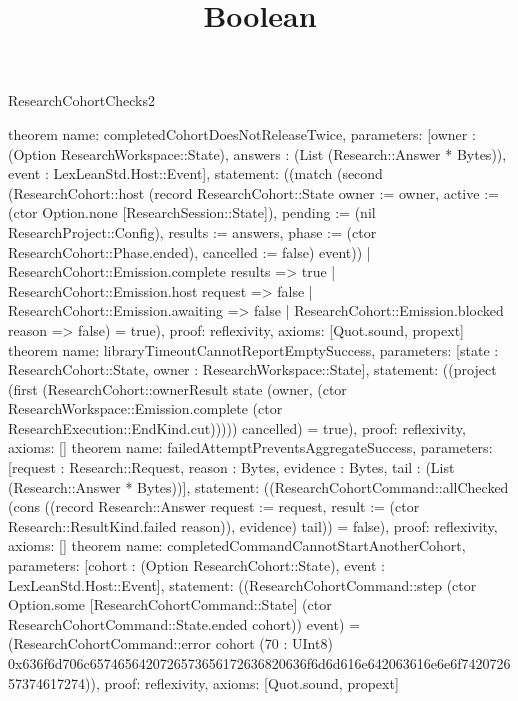 \begin{lexlean}{ResearchCohortChecks2}
\title{Boolean}
\begin{semanticmodule}
theorem{
 name: completedCohortDoesNotReleaseTwice,
 parameters: [owner : (Option ResearchWorkspace::State), answers : (List (Research::Answer * Bytes)), event : LexLeanStd.Host::Event],
 statement: ((match (second (ResearchCohort::host (record ResearchCohort::State {owner := owner, active := (ctor Option.none [ResearchSession::State]), pending := (nil ResearchProject::Config), results := answers, phase := (ctor ResearchCohort::Phase.ended), cancelled := false}) event)) | ResearchCohort::Emission.complete results => true | ResearchCohort::Emission.host request => false | ResearchCohort::Emission.awaiting => false | ResearchCohort::Emission.blocked reason => false) = true),
 proof: reflexivity{},
 axioms: [Quot.sound, propext]
}
theorem{
 name: libraryTimeoutCannotReportEmptySuccess,
 parameters: [state : ResearchCohort::State, owner : ResearchWorkspace::State],
 statement: ((project (first (ResearchCohort::ownerResult state (owner, (ctor ResearchWorkspace::Emission.complete (ctor ResearchExecution::EndKind.cut))))) cancelled) = true),
 proof: reflexivity{},
 axioms: []
}
theorem{
 name: failedAttemptPreventsAggregateSuccess,
 parameters: [request : Research::Request, reason : Bytes, evidence : Bytes, tail : (List (Research::Answer * Bytes))],
 statement: ((ResearchCohortCommand::allChecked (cons ((record Research::Answer {request := request, result := (ctor Research::ResultKind.failed reason)}), evidence) tail)) = false),
 proof: reflexivity{},
 axioms: []
}
theorem{
 name: completedCommandCannotStartAnotherCohort,
 parameters: [cohort : (Option ResearchCohort::State), event : LexLeanStd.Host::Event],
 statement: ((ResearchCohortCommand::step (ctor Option.some [ResearchCohortCommand::State] (ctor ResearchCohortCommand::State.ended cohort)) event) = (ResearchCohortCommand::error cohort (70 : UInt8) 0x636f6d706c6574656420726573656172636820636f6d6d616e642063616e6e6f742072657374617274)),
 proof: reflexivity{},
 axioms: [Quot.sound, propext]
}
\end{semanticmodule}
\end{lexlean}
